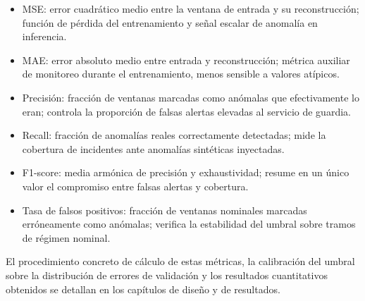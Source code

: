 \begin{itemize}
\item MSE: error cuadrático medio entre la ventana de entrada y su reconstrucción; función de pérdida del entrenamiento y señal escalar de anomalía en inferencia.
\item MAE: error absoluto medio entre entrada y reconstrucción; métrica auxiliar de monitoreo durante el entrenamiento, menos sensible a valores atípicos.
\item Precisión: fracción de ventanas marcadas como anómalas que efectivamente lo eran; controla la proporción de falsas alertas elevadas al servicio de guardia.
\item Recall: fracción de anomalías reales correctamente detectadas; mide la cobertura de incidentes ante anomalías sintéticas inyectadas.
\item F1-score: media armónica de precisión y exhaustividad; resume en un único valor el compromiso entre falsas alertas y cobertura.
\item Tasa de falsos positivos: fracción de ventanas nominales marcadas erróneamente como anómalas; verifica la estabilidad del umbral sobre tramos de régimen nominal.
\end{itemize}

El procedimiento concreto de cálculo de estas métricas, la calibración del umbral sobre la distribución de errores de validación y los resultados cuantitativos obtenidos se detallan en los capítulos de diseño y de resultados.


